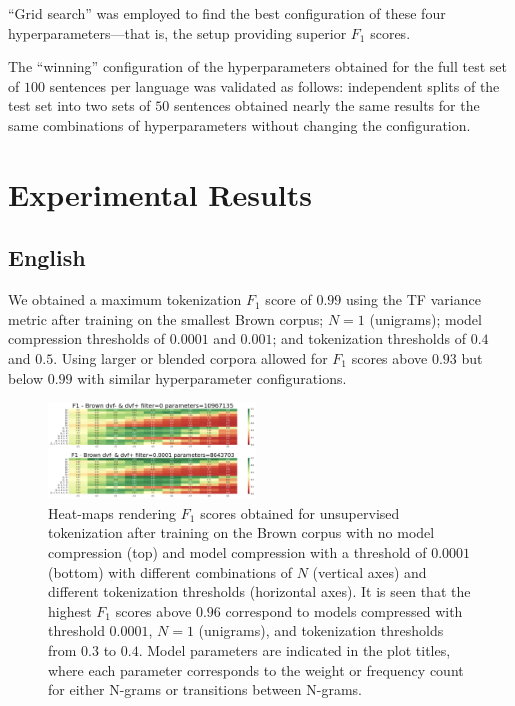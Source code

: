 \documentclass[11pt]{article}
\begin{document}
 “Grid search” was employed to find the best configuration of these four hyperparameters—that is, the setup providing superior $F_1$ scores.

The “winning” configuration of the hyperparameters obtained for the full test set of $100$ sentences per language was validated as follows: independent splits of the test set into two sets of $50$ sentences obtained nearly the same results for the same combinations of hyperparameters without changing the configuration.

\section{Experimental Results}

\subsection{\label{41}English}

We obtained a maximum tokenization $F_1$ score of $0.99$ using the TF variance metric after training on the smallest Brown corpus; $N=1$ (unigrams); model compression thresholds of $0.0001$ and $0.001$; and tokenization thresholds of $0.4$ and $0.5$.  Using larger or blended corpora allowed for $F_1$ scores above $0.93$ but below $0.99$ with similar hyperparameter configurations.

\begin{figure}
  \includegraphics[width=0.49\textwidth]{emnlp2022/imgs/figure6.png}
  \caption{Heat-maps rendering $F_1$ scores obtained for unsupervised tokenization after training on the Brown corpus with no model compression (top) and model compression with a threshold of $0.0001$ (bottom) with different combinations of $N$ (vertical axes) and different tokenization thresholds (horizontal axes). It is seen that the highest $F_1$ scores above $0.96$ correspond to models compressed with threshold $0.0001$, $N=1$ (unigrams), and tokenization thresholds from $0.3$ to $0.4$. Model parameters are indicated in the plot titles, where each parameter corresponds to the weight or frequency count for either N-grams or transitions between N-grams.}
\end{figure}
\end{document}
